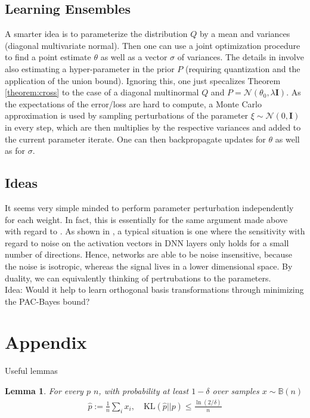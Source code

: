 \documentclass[10pt,a4paper]{article}
\newtheorem{lemma}{Lemma}
\begin{document}
\subsection{Learning Ensembles} 

A smarter idea is to parameterize the distribution $Q$ by a mean and variances (diagonal multivariate normal).  Then one can use a joint  optimization procedure to find a point estimate $\theta$ as well as a vector $\sigma$ of variances. The details in \cite{dziugaite2017computing} involve also estimating a hyper-parameter in the prior $P$ (requiring quantization and the application of the union bound). Ignoring this, one just specalizes Theorem \ref{theorem:cross} to the case of a diagonal multinormal $Q$ and $P=\mathcal N (\theta_0,\lambda \mathbf I)$. As the expectations of the error/loss are hard to compute, a Monte Carlo approximation is used by sampling perturbations of the parameter $\xi \sim \mathcal N(0,\mathbf I)$ in every step, which are then multiplies by the respective variances and added to the current parameter iterate. One can then backpropagate updates for $\theta$ as well as for $\sigma$. 

\subsection{Ideas}

It seems very simple minded to perform parameter perturbation independently for each weight. In fact, this is essentially for the same argument made above with regard to \cite{langford2002not}. As shown in \cite{arora2018stronger}, a typical situation is one where the sensitivity with regard to noise on the activation vectors in DNN layers only holds for a small number of directions. Hence, networks are able to be noise insensitive, because the noise is isotropic, whereas the signal lives in a lower dimensional space. By duality, we can equivalently thinking of pertrubations to the parameters.  \\

Idea: Would it help to learn orthogonal basis transformations through minimizing the PAC-Bayes bound? 


\section{Appendix}

Useful lemmas
\begin{lemma}
For every $p$ $n$, with probability at least $1-\delta$ over samples $x \sim \mathbb B(n)$
\begin{align*}
\hat p := \frac 1n \sum_i x_i, \quad \text{KL}(\hat p||p) \le  \frac{\ln(2/\delta)}{n}
\end{align*}
\end{lemma}
\end{document}
